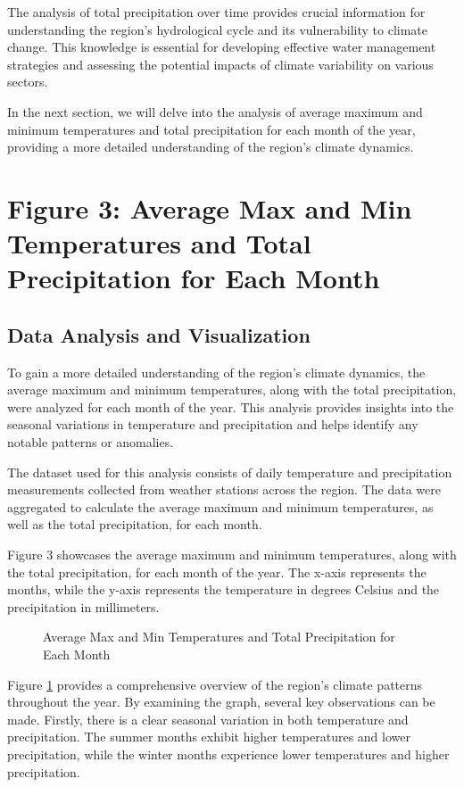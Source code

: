 \documentclass{article}
\begin{document}
The analysis of total precipitation over time provides crucial information for understanding the region's hydrological cycle and its vulnerability to climate change. This knowledge is essential for developing effective water management strategies and assessing the potential impacts of climate variability on various sectors.

In the next section, we will delve into the analysis of average maximum and minimum temperatures and total precipitation for each month of the year, providing a more detailed understanding of the region's climate dynamics.

\section{Figure 3: Average Max and Min Temperatures and Total Precipitation for Each Month}

\subsection{Data Analysis and Visualization}

To gain a more detailed understanding of the region's climate dynamics, the average maximum and minimum temperatures, along with the total precipitation, were analyzed for each month of the year. This analysis provides insights into the seasonal variations in temperature and precipitation and helps identify any notable patterns or anomalies.

The dataset used for this analysis consists of daily temperature and precipitation measurements collected from weather stations across the region. The data were aggregated to calculate the average maximum and minimum temperatures, as well as the total precipitation, for each month.

Figure 3 showcases the average maximum and minimum temperatures, along with the total precipitation, for each month of the year. The x-axis represents the months, while the y-axis represents the temperature in degrees Celsius and the precipitation in millimeters.

\begin{figure}[h]
  \centering
  \caption{Average Max and Min Temperatures and Total Precipitation for Each Month}
  \label{fig:temp_precip_month}
\end{figure}

Figure \ref{fig:temp_precip_month} provides a comprehensive overview of the region's climate patterns throughout the year. By examining the graph, several key observations can be made. Firstly, there is a clear seasonal variation in both temperature and precipitation. The summer months exhibit higher temperatures and lower precipitation, while the winter months experience lower temperatures and higher precipitation.
\end{document}
